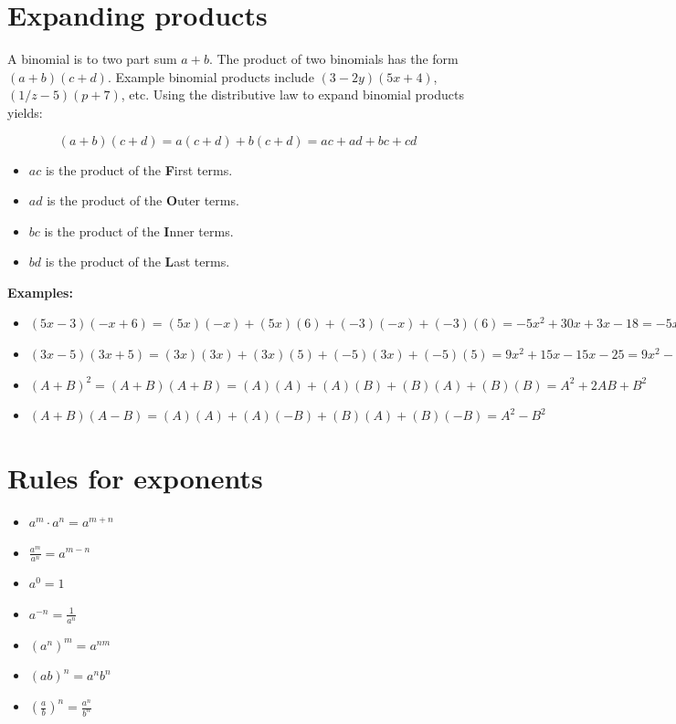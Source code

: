 \documentclass{article}
\begin{document}
\section{Expanding products}

A binomial is to two part sum \(a + b\). The product of two binomials has the form \((a + b)(c + d)\). Example binomial products include \((3 - 2y)(5x + 4)\), \((1/z - 5)(p + 7)\), etc. Using the distributive law to expand binomial products yields: 

\[(a + b)(c + d) = a(c + d) + b(c + d) = ac + ad + bc + cd\]

\begin{itemize}
\item \(ac\) is the product of the {\bf F}irst terms. 
\item \(ad\) is the product of the {\bf O}uter terms. 
\item \(bc\) is the product of the {\bf I}nner terms. 
\item \(bd\) is the product of the {\bf L}ast terms. 
\end{itemize}

\textbf{Examples:}
\begin{itemize}
\item \((5x - 3)(-x + 6) = (5x)(-x) + (5x)(6) + (-3)(-x) + (-3)(6) = -5x^2 + 30x + 3x - 18 = -5x^2 + 33x - 18\)
\item \((3x - 5)(3x + 5) = (3x)(3x) + (3x)(5) + (-5)(3x) + (-5)(5) = 9x^2 + 15x - 15x - 25 = 9x^2 - 25\)
\item \((A + B)^2 = (A + B)(A + B) = (A)(A) + (A)(B) + (B)(A) + (B)(B) = A^2 + 2AB + B^2\)
\item \((A + B)(A - B) = (A)(A) + (A)(-B) + (B)(A) + (B)(-B) = A^2 - B^2\)
\end{itemize}



\section{Rules for exponents}

\begin{itemize}
\item \(a^m \cdot a^n = a^{m+n}\)
\item \(\frac{a^m}{a^n} = a^{m-n}\)
\item \(a^0 = 1\)
\item \(a^{-n} = \frac{1}{a^n}\)
\item \((a^n)^m = a^{nm}\)
\item \((ab)^n = a^n b^n\)
\item \(\left(\frac{a}{b}\right)^n = \frac{a^n}{b^n}\)
\end{itemize}
\end{document}
